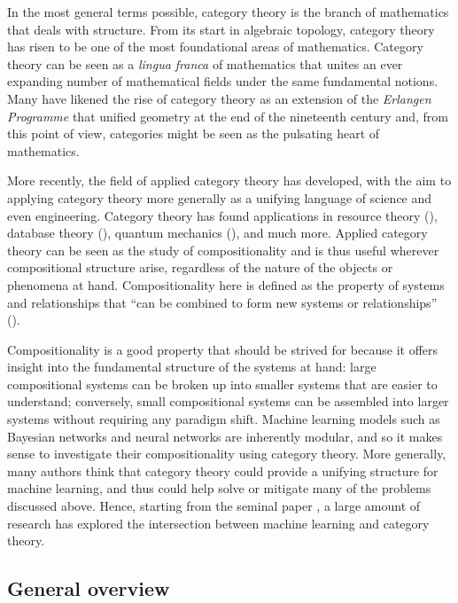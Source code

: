 \documentclass[11pt,a4paper,openright,twoside]{report}
\theoremstyle{plain}
\theoremstyle{definition}
\newcommand\dblquote[1]{\textquotedblleft #1\textquotedblright}
\begin{document}
In the most general terms possible, category theory is the branch of mathematics that deals with structure. From its start in algebraic topology, category theory has risen to be one of the most foundational areas of mathematics. Category theory can be seen as a \textit{lingua franca} of mathematics that unites an ever expanding number of mathematical fields under the same fundamental notions. Many have likened the rise of category theory as an extension of the \textit{Erlangen Programme} that unified geometry at the end of the nineteenth century and, from this point of view, categories might be seen as the pulsating heart of mathematics.

More recently, the field of applied category theory has developed, with the aim to applying category theory more generally as a unifying language of science and even engineering. Category theory has found applications in resource theory (\cite{coecke2016mathematical}), database theory (\cite{spivak2012functorial}), quantum mechanics (\cite{abramsky2009categorical}), and much more. Applied category theory can be seen as the study of compositionality and is thus useful wherever compositional structure arise, regardless of the nature of the objects or phenomena at hand. Compositionality here is defined as the property of systems and relationships that \dblquote{can be combined to form new systems or relationships} (\cite{fong2018seven}).

Compositionality is a good property that should be strived for because it offers insight into the fundamental structure of the systems at hand: large compositional systems can be broken up into smaller systems that are easier to understand; conversely, small compositional systems can be assembled into larger systems without requiring any paradigm shift. Machine learning models such as Bayesian networks and neural networks are inherently modular, and so it makes sense to investigate their compositionality using category theory. More generally, many authors think that category theory could provide a unifying structure for machine learning, and thus could help solve or mitigate many of the problems discussed above. Hence, starting from the seminal paper \cite{fong2019backprop}, a large amount of research has explored the intersection between machine learning and category theory. 

\subsection*{General overview}
\end{document}
